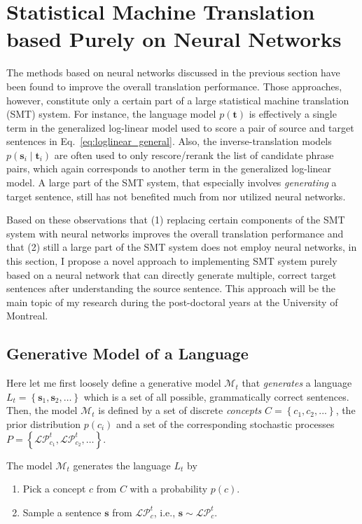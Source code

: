 \documentclass[11pt, oneside]{essay}
\newcommand{\vect}[1]{\mathbf{#1}}
\newcommand{\vs}[0]{\vect{s}}
\newcommand{\vt}[0]{\vect{t}}
\begin{document}
\section{Statistical Machine Translation based Purely on Neural Networks}
\label{sec:new_approach}

The methods based on neural networks discussed in the previous
section have been found to improve the overall translation
performance. Those approaches, however, constitute only a certain
part of a large statistical machine translation (SMT) system. For
instance, the language model $p(\vt)$ is effectively a single
term in the generalized log-linear model used to score a pair of
source and target sentences in Eq.~\eqref{eq:loglinear_general}.
Also, the inverse-translation models $p(\vs_i \mid \vt_i)$ are
often used to only rescore/rerank the list of candidate phrase
pairs, which again corresponds to another term in the generalized
log-linear model.  A large part of the SMT system, that
especially involves
\textit{generating} a target sentence, still has not benefited
much from nor utilized neural networks. 

Based on these observations that (1) replacing certain components
of the SMT system with neural networks improves the overall
translation performance and that (2) still a large part of the
SMT system does not employ neural networks, in this section, I
propose a novel approach to implementing SMT system purely based
on a neural network that can directly generate multiple, correct
target sentences after understanding the source sentence. This
approach will be the main topic of my research during the
post-doctoral years at the University of Montreal.

\subsection{Generative Model of a Language}
\label{sec:genlm}

Here let me first loosely define a generative model
$\mathcal{M}_t$ that \textit{generates} a language $L_t=\left\{
\vs_1, \vs_2, \dots \right\}$ which is a set of all possible,
grammatically correct sentences. Then, the model $\mathcal{M}_t$
is defined by a set of
discrete \textit{concepts} $C = \left\{ c_1, c_2, ... \right\}$,
the prior distribution $p(c_i)$ and 
a set of the corresponding stochastic processes $P=\left\{
\mathcal{LP}^t_{c_1}, \mathcal{LP}^t_{c_2}, \dots \right\}$.

The model $\mathcal{M}_t$ generates the language $L_t$ by
\begin{enumerate}
\item Pick a concept $c$ from $C$ with a probability $p(c)$.
\item Sample a sentence $\vs$ from $\mathcal{LP}^t_c$, i.e., $\vs \sim
\mathcal{LP}^t_c$.
\end{enumerate}
\end{document}
